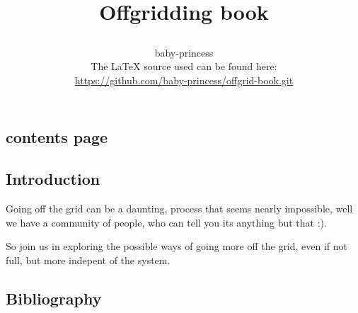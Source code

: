 \documentclass[a4paper,12pt,titlepage]{article}
\author{%
baby-princess \\
The LaTeX source used can be found here: \\
\url{https://github.com/baby-princess/offgrid-book.git}}
\title{
\titlehead{\centering\texttt{[image: CC-SA.png]}}\\
Offgridding book
}
\begin{document}
\maketitle
\begin{centering}
\section{contents page}
\end{centering}
\tableofcontents
\newpage
\begin{centering}
\section{Introduction}
\end{centering}
Going off the grid can be a daunting, process that seems nearly impossible, well we have a community of people, who can tell you its anything but that :).


So join us in exploring the possible ways of going more off the grid, even if not full, but more indepent of the system.
\newpage

% 



\newpage
\begin{centering}
\section{Bibliography}
\end{centering}
\begin{refsection}



\printbibliography
\end{refsection}
\end{document}
